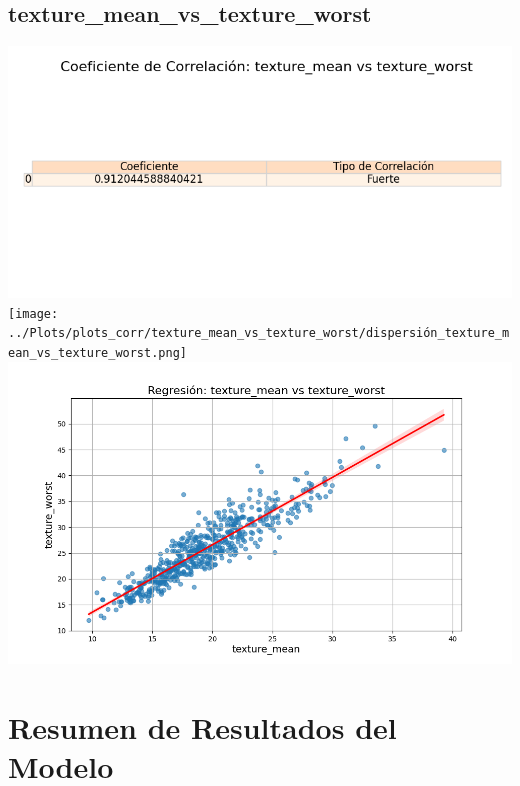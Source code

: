 \documentclass[a4paper, 12pt]{article}
\begin{document}
\subsection{texture\_mean\_vs\_texture\_worst}
    \includegraphics[width = \textwidth]{../Plots/plots_corr/texture_mean_vs_texture_worst/coeficiente_correlacion_texture_mean_vs_texture_worst.png}
    \texttt{[image: ../Plots/plots\_corr/texture\_mean\_vs\_texture\_worst/dispersión\_texture\_mean\_vs\_texture\_worst.png]}
    \includegraphics[width = \textwidth]{../Plots/plots_corr/texture_mean_vs_texture_worst/regresion_texture_mean_vs_texture_worst.png}

\section{Resumen de Resultados del Modelo}
\end{document}
